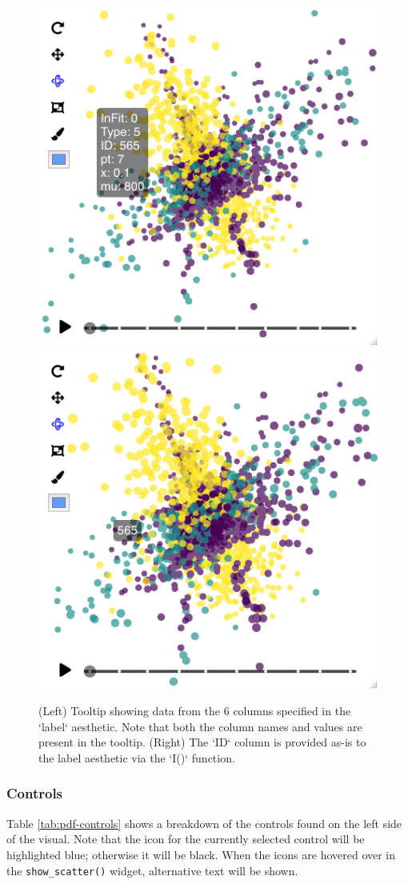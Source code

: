 \begin{figure}
\includegraphics[width=0.5\linewidth]{figures/implementation/hover_tooltip} \includegraphics[width=0.5\linewidth]{figures/implementation/hover_tooltip_asis} \caption{(Left) Tooltip showing data from the 6 columns specified in the `label` aesthetic. Note that both the column names and values are present in the tooltip. (Right) The `ID` column is provided as-is to the label aesthetic via the `I()` function.}\label{fig:hover-tooltip}
\end{figure}

\hypertarget{controls}{%
\subsubsection{Controls}\label{controls}}

Table \ref{tab:pdf-controls} shows a breakdown of the controls found on the left side of the visual. Note that the icon for the currently selected control will be highlighted blue; otherwise it will be black. When the icons are hovered over in the \texttt{show\_scatter()} widget, alternative text will be shown.


